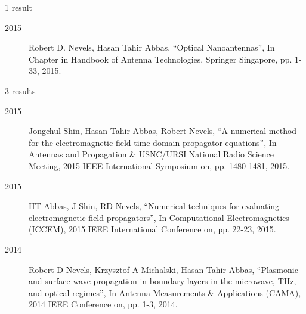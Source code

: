 1 result
\begin{description}
\item[2015]Robert D. Nevels, Hasan Tahir Abbas, ``Optical Nanoantennas'', In Chapter in Handbook of Antenna Technologies, Springer Singapore, pp. 1-33, 2015.
\end{description}


3 results
\begin{description}
\item[2015]Jongchul Shin, Hasan Tahir Abbas, Robert Nevels, ``A numerical method for the electromagnetic field time domain propagator equations'', In Antennas and Propagation \& USNC/URSI National Radio Science Meeting, 2015 IEEE International Symposium on, pp. 1480-1481, 2015.
\item[2015]HT Abbas, J Shin, RD Nevels, ``Numerical techniques for evaluating electromagnetic field propagators'', In Computational Electromagnetics (ICCEM), 2015 IEEE International Conference on, pp. 22-23, 2015.
\item[2014]Robert D Nevels, Krzysztof A Michalski, Hasan Tahir Abbas, ``Plasmonic and surface wave propagation in boundary layers in the microwave, THz, and optical regimes'', In Antenna Measurements \& Applications (CAMA), 2014 IEEE Conference on, pp. 1-3, 2014.
\end{description}

